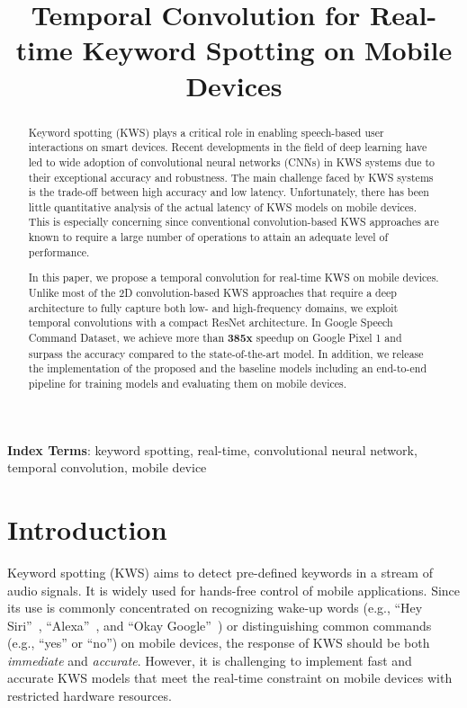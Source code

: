 \documentclass[a4paper]{article}
\title{Temporal Convolution for Real-time Keyword Spotting on Mobile Devices}
\begin{document}
\maketitle





\begin{abstract}
Keyword spotting (KWS) plays a critical role in enabling speech-based user interactions on smart devices.
Recent developments in the field of deep learning have led to wide adoption of convolutional neural networks (CNNs) in KWS systems due to their exceptional accuracy and robustness.
The main challenge faced by KWS systems is the trade-off between high accuracy and low latency.
Unfortunately, there has been little quantitative analysis of the actual latency of KWS models on mobile devices.
This is especially concerning since conventional convolution-based KWS approaches are known to require a large number of operations to attain an adequate level of performance.

In this paper, we propose a temporal convolution for real-time KWS on mobile devices.
Unlike most of the 2D convolution-based KWS approaches that require a deep architecture to fully capture both low- and high-frequency domains, we exploit temporal convolutions with a compact ResNet architecture.
In Google Speech Command Dataset, we achieve more than \textbf{385x} speedup on Google Pixel 1 and surpass the accuracy compared to the state-of-the-art model.
In addition, we release the implementation of the proposed and the baseline models including an end-to-end pipeline for training models and evaluating them on mobile devices.
\end{abstract}





\noindent\textbf{Index Terms}: keyword spotting, real-time, convolutional neural network, temporal convolution, mobile device





\section{Introduction}

Keyword spotting (KWS) aims to detect pre-defined keywords in a stream of audio signals.
It is widely used for hands-free control of mobile applications.
Since its use is commonly concentrated on recognizing wake-up words (e.g., ``Hey Siri''~\cite{sigtia-interspeech-2018-heysiri}, ``Alexa''~\cite{sun-interspeech-2017-alexa, tucker-interspeech-2016-alexa}, and ``Okay Google''~\cite{chen-icassp-2014-OkayGoogle}) or distinguishing common commands (e.g., ``yes'' or ``no'') on mobile devices, the response of KWS should be both \emph{immediate} and \emph{accurate}.
However, it is challenging to implement fast and accurate KWS models that meet the real-time constraint on mobile devices with restricted hardware resources.
\end{document}

